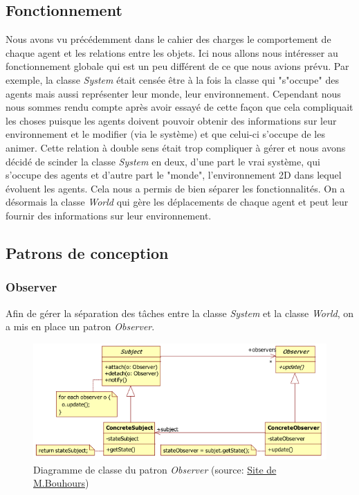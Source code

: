 \documentclass[a4paper, 12pt]{article}
\begin{document}
\subsection{Fonctionnement}
Nous avons vu précédemment dans le cahier des charges le comportement de chaque agent et les relations entre les objets.
Ici nous allons nous intéresser au fonctionnement globale qui est un peu différent de ce que nous avions prévu. Par exemple,
la classe \emph{System} était censée être à la fois la classe qui "s"occupe" des agents mais aussi représenter leur
monde, leur environnement. Cependant nous nous sommes rendu compte après avoir essayé de cette façon que cela compliquait
les choses puisque les agents doivent pouvoir obtenir des informations sur leur environnement et le modifier (via le système) et que
celui-ci s'occupe de les animer. Cette relation à double sens était trop compliquer à gérer et nous avons décidé de scinder
la classe \emph{System} en deux, d'une part le vrai système, qui s'occupe des agents et d'autre part le "monde", l'environnement
2D dans lequel évoluent les agents. Cela nous a permis de bien séparer les fonctionnalités.
On a désormais la classe \emph{World} qui gère les déplacements de chaque agent et peut leur fournir
des informations sur leur environnement.

\subsection{Patrons de conception}
\subsubsection{Observer}
Afin de gérer la séparation des tâches entre la classe \emph{System} et la classe \emph{World},
on a mis en place un patron \emph{Observer}.
\begin{figure}[!h]
  \centering
  \caption{Diagramme de classe du patron \emph{Observer} (source: \href{http://www.goprod.bouhours.net/?page=pattern&pat_id=16}{Site de M.Bouhours})}
  \includegraphics[scale=0.7]{img/observer.png}
\end{figure}
\end{document}
